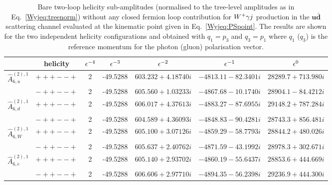 \documentclass[main.tex]{subfiles}
\begin{document}
\begin{table}[t!]
\centering
\begin{tabularx}{1.0\textwidth}{|C{0.7}|C{1.0}|C{0.6}|C{1.0}|C{1.2}|C{1.2}|C{1.3}|}
\hline
      & helicity & $\epsilon^{-4}$ & $\epsilon^{-3}$ & $\epsilon^{-2}$ & $\epsilon^{-1}$ & $\epsilon^{0}$ \\
\hline
$\hat A^{(2),1}_{6,u}$ & $\scriptstyle +++--+$ & 2 & -49.5288 & $603.232 + 4.18740 i$ & $-4813.11 - 82.3401 i$ & $28289.7 + 713.980 i$ \\
                   & $\scriptstyle -++--+$ & 2 & -49.5288 & $605.560 + 1.03233 i$ & $-4867.68 - 10.1740 i$ & $28904.1 - 84.4212 i$ \\
\hline
$\hat A^{(2),1}_{6,d}$ & $\scriptstyle +++--+$ & 2 & -49.5288 & $606.017 + 4.37613 i$ & $-4883.27 - 87.6955 i$ & $29148.2 + 787.284 i$ \\
                   & $\scriptstyle -++--+$ & 2 & -49.5288 & $604.589 + 4.36093 i$ & $-4848.83 - 90.4281 i$ & $28743.3 + 856.481 i$ \\
\hline
$\hat A^{(2),1}_{6,W}$ & $\scriptstyle +++--+$ & 2 & -49.5288 & $605.100 + 3.07126 i$ & $-4859.29 - 58.7793 i$ & $28844.2 + 480.026 i$ \\
                   & $\scriptstyle -++--+$ & 2 & -49.5288 & $605.637 + 2.40762 i$ & $-4871.59 - 43.1992 i$ & $28978.3 + 302.671 i$ \\
\hline
$\hat A^{(2),1}_{6,e}$ & $\scriptstyle +++--+$ & 2 & -49.5288 & $605.140 + 2.93702 i$ & $-4860.19 - 55.6437 i$ & $28853.6 + 444.669 i$ \\
                   & $\scriptstyle -++--+$ & 2 & -49.5288 & $606.606 + 2.97710 i$ & $-4894.35 - 56.2398 i$ & $29236.9 + 444.300 i$ \\
\hline
\end{tabularx}
\caption{\label{Wyjtab:benchmark2Lnf0bare} 
Bare two-loop helicity sub-amplitudes (normalised to the tree-level amplitudes as in Eq.~\eqref{Wyjeq:treenorm}) without any closed fermion loop contribution 
for $W^+\gamma j$ production in the $\mathbf{u\bar{d}}$ scattering channel 
evaluated at the kinematic point given in Eq.~\eqref{Wyjeq:PSpoint}. The results are shown for the two independent helicity configurations and obtained with $q_1 = p_3$ and $q_3 = p_1$ where $q_1$ ($q_3$) is the 
reference momentum for the photon (gluon) polarisation vector.
}
\end{table}
%
\end{document}
